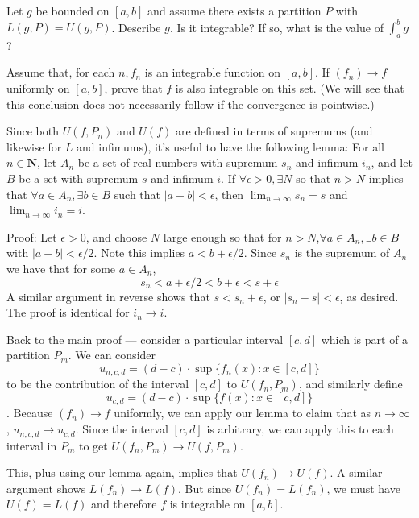 \begin{exercise}
Let $g$ be bounded on $[a, b]$ and assume there exists a partition $P$ with $L(g, P)=U(g, P)$. Describe $g$. Is it integrable? If so, what is the value of $\int_{a}^{b} g$ ?
\end{exercise}
\begin{solution}
    \TODO
\end{solution}

\begin{exercise}
Assume that, for each $n, f_{n}$ is an integrable function on $[a, b]$. If $\left(f_{n}\right) \rightarrow f$ uniformly on $[a, b]$, prove that $f$ is also integrable on this set. (We will see that this conclusion does not necessarily follow if the convergence is pointwise.)
\end{exercise}
\begin{solution}
Since both \(U(f, P_n) \) and \(U(f)\) are defined in terms of supremums (and likewise for \(L\) and infimums), it's useful to have the following lemma: For all \(n \in \mathbf{N}\), let \(A_n\) be a set of real numbers with supremum \(s_n\) and infimum \(i_n\), and let \(B\) be a set with supremum \(s\) and infimum \(i\). If \( \forall \epsilon > 0, \exists N\) so that \(n > N\) implies that \(\forall a \in A_n, \exists b \in B \) such that \(|a-b| < \epsilon\), then \(\lim_{n \to \infty} s_n = s\) and \(\lim_{n \to \infty} i_n = i\).

Proof: Let \(\epsilon > 0\), and choose \(N\) large enough so that for \(n > N\),\(\forall a \in A_n, \exists b \in B \) with \(|a - b| < \epsilon / 2\). Note this implies \(a < b + \epsilon / 2\). Since \(s_n\) is the supremum of \(A_n\) we have
that for some \(a \in A_n\),
\[s_n < a + \epsilon/2  < b + \epsilon < s + \epsilon\]
 A similar argument in reverse shows that \(s < s_n + \epsilon\), or \(|s_n - s| < \epsilon\), as desired. The proof is identical for \(i_n \to i\).

Back to the main proof --- consider a particular interval \([c,d]\) which is part of a partition \(P_m\). We can consider
    \[u_{n,c,d} = (d-c) \cdot \sup\{f_n(x) : x \in [c,d]\}\]
    to be the contribution of the interval \([c,d]\) to \(U(f_n, P_m)\), and similarly define \[u_{c,d} = (d-c) \cdot \sup\{f(x) : x \in [c,d]\}\].
    Because \((f_n) \to f\) uniformly, we can apply our lemma to claim that as \(n \to \infty\), \(u_{n,c,d} \to u_{c,d}\). Since the interval \([c,d]\) is arbitrary, we can apply this to each interval in \(P_m\) to get \(U(f_n,P_m) \to U(f, P_m)\).

    This, plus using our lemma again, implies that \(U(f_n) \to U(f)\). A similar argument shows \(L(f_n) \to L(f)\). But since \(U(f_n) = L(f_n)\), we must have \(U(f) = L(f)\) and therefore \(f\) is integrable on \([a,b]\).
\end{solution}

